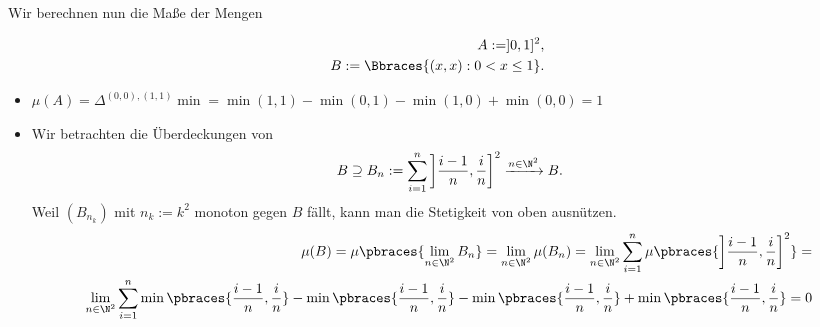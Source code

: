 \begin{solution}
Wir berechnen nun die Maße der Mengen

\begin{align*}
  A := ]0, 1]^2, \\
  B := \Bbraces{(x, x): 0 < x \leq 1}.
\end{align*}

\begin{itemize}

  \item $\mu(A) =
  \Delta^{(0, 0), (1, 1)} \min =
  \min(1, 1) - \min(0, 1) - \min(1, 0) + \min(0, 0) = 1$

  \item Wir betrachten die Überdeckungen von
  \begin{align*}
    B \supseteq B_n
    :=
    \sum_{i=1}^n
    \left ] \frac{i-1}{n}, \frac{i}{n} \right ]^2
    \xrightarrow{n \in \N^2} B.
  \end{align*}
  Weil $(B_{n_k})$ mit $n_k := k^2$ monoton gegen $B$ fällt, kann man die Stetigkeit von oben ausnützen.
  \begin{align*}
    \mu(B)
    =
    \mu \pbraces{\lim_{n \in \N^2} B_n}
    =
    \lim_{n \in \N^2} \mu(B_n)
    =
    \lim_{n \in \N^2} \sum_{i=1}^n \mu \pbraces
    {\left ] \frac{i-1}{n}, \frac{i}{n} \right ]^2}
    = \\
    \lim_{n \in \N^2} \sum_{i=1}^n
    \min \pbraces{\frac{i-1}{n}, \frac{i}{n}} -
    \min \pbraces{\frac{i-1}{n}, \frac{i}{n}} -
    \min \pbraces{\frac{i-1}{n}, \frac{i}{n}} +
    \min \pbraces{\frac{i-1}{n}, \frac{i}{n}}
    = 0
  \end{align*}

\end{itemize}

\end{solution}

